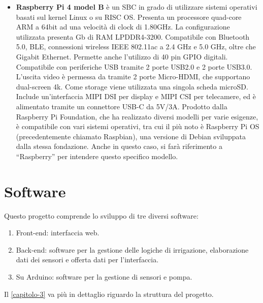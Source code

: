 \documentclass[12pt,a4paper,openright,twoside, openany]{book}
\begin{document}
\begin{itemize}[noitemsep]
    \item \textbf{Raspberry Pi 4 model B} è un \ac{SBC} in grado di utilizzare sistemi operativi basati sul kernel Linux o su RISC OS. Presenta un processore quad-core ARM a 64bit ad una velocità di clock di 1.80GHz. La configurazione utilizzata presenta  Gb di RAM LPDDR4-3200. Compatibile con Bluetooth 5.0, BLE, connessioni wireless IEEE 802.11ac a 2.4 GHz e 5.0 GHz, oltre che Gigabit Ethernet. Permette anche l'utilizzo di 40 pin GPIO digitali. Compatibile con periferiche USB tramite 2 porte USB2.0 e 2 porte USB3.0. L'uscita video è permessa da tramite 2 porte Micro-HDMI, che supportano dual-screen 4k. Come storage viene utilizzata una singola scheda microSD. Include un'interfaccia MIPI DSI per display e MIPI CSI per telecamere, ed è alimentato tramite un connettore USB-C da 5V/3A. Prodotto dalla Raspberry Pi Foundation, che ha realizzato diversi modelli per varie esigenze, è compatibile con vari sistemi operativi, tra cui il più noto è Raspberry Pi OS (precedentemente chiamato Raspbian), una versione di Debian sviluppata dalla stessa fondazione. Anche in questo caso, si farà riferimento a ``Raspberry'' per intendere questo specifico modello.
\end{itemize}

\section{Software}

Questo progetto comprende lo sviluppo di tre diversi software:
\begin{enumerate}
    \item Front-end: interfaccia web.
    \item Back-end: software per la gestione delle logiche di irrigazione, elaborazione dati dei sensori e offerta dati per l'interfaccia.
    \item Su Arduino: software per la gestione di sensori e pompa.
\end{enumerate}
Il \cref{capitolo-3} va più in dettaglio riguardo la struttura del progetto.
\end{document}
